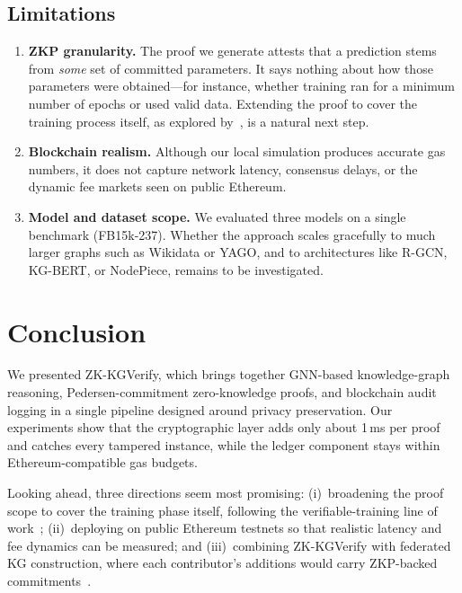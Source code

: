 \documentclass[conference, 10pt]{IEEEtran}
\begin{document}
\subsection{Limitations}

\begin{enumerate}
    \item \textbf{ZKP granularity.} The proof we generate attests that a prediction stems from \emph{some} set of committed parameters. It says nothing about how those parameters were obtained---for instance, whether training ran for a minimum number of epochs or used valid data. Extending the proof to cover the training process itself, as explored by~\cite{ghodsi2023zeroknowledge}, is a natural next step.
    \item \textbf{Blockchain realism.} Although our local simulation produces accurate gas numbers, it does not capture network latency, consensus delays, or the dynamic fee markets seen on public Ethereum.
    \item \textbf{Model and dataset scope.} We evaluated three models on a single benchmark (FB15k-237). Whether the approach scales gracefully to much larger graphs such as Wikidata or YAGO, and to architectures like R-GCN, KG-BERT, or NodePiece, remains to be investigated.
\end{enumerate}

\section{Conclusion}
\label{sec:conclusion}

We presented ZK-KGVerify, which brings together GNN-based knowledge-graph reasoning, Pedersen-commitment zero-knowledge proofs, and blockchain audit logging in a single pipeline designed around privacy preservation. Our experiments show that the cryptographic layer adds only about 1\,ms per proof and catches every tampered instance, while the ledger component stays within Ethereum-compatible gas budgets.

Looking ahead, three directions seem most promising: (i)~broadening the proof scope to cover the training phase itself, following the verifiable-training line of work~\cite{ghodsi2023zeroknowledge}; (ii)~deploying on public Ethereum testnets so that realistic latency and fee dynamics can be measured; and (iii)~combining ZK-KGVerify with federated KG construction, where each contributor's additions would carry ZKP-backed commitments~\cite{chen2021federated}.

\balance


\end{document}
